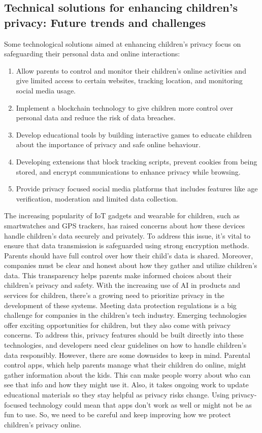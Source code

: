 \documentclass[a4paper, 10 pt, conference]{ieeeconf}  %
\begin{document}
\subsection{Technical solutions for enhancing children’s privacy: Future trends and challenges}
Some technological solutions aimed at enhancing children’s privacy focus on safeguarding their personal data and online interactions:
\begin{enumerate}
    \item Allow parents to control and monitor their children’s online activities and give limited access to certain websites, tracking location, and monitoring social media usage. 
    \item Implement a blockchain technology to give children more control over personal data and reduce the risk of data breaches.
    \item Develop educational tools by building interactive games to educate children about the importance of privacy and safe online behaviour.
    \item Developing extensions that block tracking scripts, prevent cookies from being stored, and encrypt communications to enhance privacy while browsing.
    \item Provide privacy focused social media platforms that includes features like age verification, moderation and limited data collection.
\end{enumerate}
The increasing popularity of IoT gadgets and wearable for children, such as smartwatches and GPS trackers, has raised concerns about how these devices handle children’s data securely and privately. To address this issue, it’s vital to ensure that data transmission is safeguarded using strong encryption methods. Parents should have full control over how their child’s data is shared. Moreover, companies must be clear and honest about how they gather and utilize children’s data. This transparency helps parents make informed choices about their children's privacy and safety. With the increasing use of AI in products and services for children, there’s a growing need to prioritize privacy in the development of these systems. Meeting data protection regulations is a big challenge for companies in the children’s tech industry. Emerging technologies offer exciting opportunities for children, but they also come with privacy concerns. To address this, privacy features should be built directly into these technologies, and developers need clear guidelines on how to handle children’s data responsibly. However, there are some downsides to keep in mind. Parental control apps, which help parents manage what their children do online, might gather information about the kids. This can make people worry about who can see that info and how they might use it. Also, it takes ongoing work to update educational materials so they stay helpful as privacy risks change. Using privacy-focused technology could mean that apps don’t work as well or might not be as fun to use. So, we need to be careful and keep improving how we protect children’s privacy online.
\end{document}
